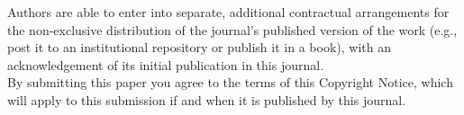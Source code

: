 \documentclass{jors}
\begin{document}
Authors are able to enter into separate, additional contractual arrangements for the non-exclusive distribution of the journal's published version of the work (e.g., post it to an institutional repository or publish it in a book), with an acknowledgement of its initial publication in this journal. \\

By submitting this paper you agree to the terms of this Copyright Notice, which will apply to this submission if and when it is published by this journal.
\end{document}
